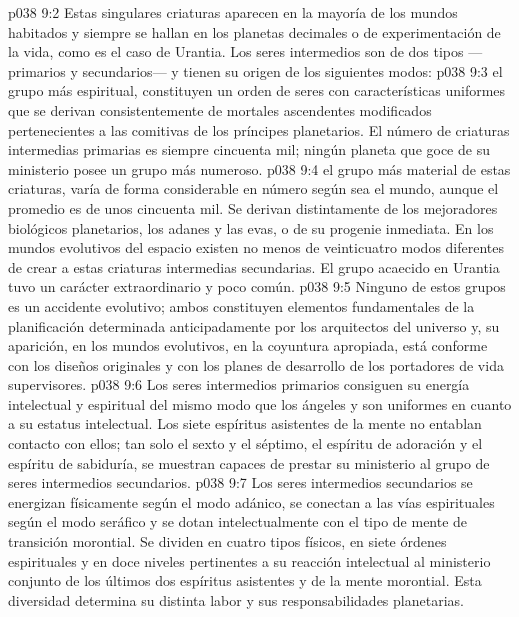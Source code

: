 \vs p038 9:2 Estas singulares criaturas aparecen en la mayoría de los mundos habitados y siempre se hallan en los planetas decimales o de experimentación de la vida, como es el caso de Urantia. Los seres intermedios son de dos tipos ---primarios y secundarios--- y tienen su origen de los siguientes modos:
\vs p038 9:3  el grupo más espiritual, constituyen un orden de seres con características uniformes que se derivan consistentemente de mortales ascendentes modificados pertenecientes a las comitivas de los príncipes planetarios. El número de criaturas intermedias primarias es siempre cincuenta mil; ningún planeta que goce de su ministerio posee un grupo más numeroso.
\vs p038 9:4  el grupo más material de estas criaturas, varía de forma considerable en número según sea el mundo, aunque el promedio es de unos cincuenta mil. Se derivan distintamente de los mejoradores biológicos planetarios, los adanes y las evas, o de su progenie inmediata. En los mundos evolutivos del espacio existen no menos de veinticuatro modos diferentes de crear a estas criaturas intermedias secundarias. El grupo acaecido en Urantia tuvo un carácter extraordinario y poco común.
\vs p038 9:5 \pc Ninguno de estos grupos es un accidente evolutivo; ambos constituyen elementos fundamentales de la planificación determinada anticipadamente por los arquitectos del universo y, su aparición, en los mundos evolutivos, en la coyuntura apropiada, está conforme con los diseños originales y con los planes de desarrollo de los portadores de vida supervisores.
\vs p038 9:6 Los seres intermedios primarios consiguen su energía intelectual y espiritual del mismo modo que los ángeles y son uniformes en cuanto a su estatus intelectual. Los siete espíritus asistentes de la mente no entablan contacto con ellos; tan solo el sexto y el séptimo, el espíritu de adoración y el espíritu de sabiduría, se muestran capaces de prestar su ministerio al grupo de seres intermedios secundarios.
\vs p038 9:7 Los seres intermedios secundarios se energizan físicamente según el modo adánico, se conectan a las vías espirituales según el modo seráfico y se dotan intelectualmente con el tipo de mente de transición morontial. Se dividen en cuatro tipos físicos, en siete órdenes espirituales y en doce niveles pertinentes a su reacción intelectual al ministerio conjunto de los últimos dos espíritus asistentes y de la mente morontial. Esta diversidad determina su distinta labor y sus responsabilidades planetarias.
